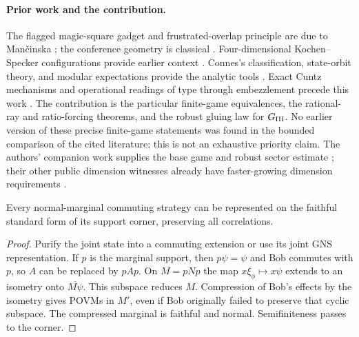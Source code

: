 \paragraph{Prior work and the contribution.}
The flagged magic-square gadget and frustrated-overlap principle are due to Man\v cinska \cite{FMS}; the conference geometry is classical \cite{Conference}. Four-dimensional Kochen--Specker configurations provide earlier context \cite{Cabello}. Connes's classification, state-orbit theory, and modular expectations provide the analytic tools \cite{Connes,CS,HS,Takesaki}. Exact Cuntz mechanisms and operational readings of type through embezzlement precede this work \cite{Harris,VLSWW}. The contribution is the particular finite-game equivalences, the rational-ray and ratio-forcing theorems, and the robust gluing law for $G_{\mathrm{III}}$. No earlier version of these precise finite-game statements was found in the bounded comparison of the cited literature; this is not an exhaustive priority claim. The authors' companion work supplies the base game and robust sector estimate \cite{Base}; their other public dimension witnesses already have faster-growing dimension requirements \cite{Explicit,Precision}.

\begin{lemma}\label{lem:support}
Every normal-marginal commuting strategy can be represented on the faithful standard form of its support corner, preserving all correlations.
\end{lemma}
\begin{proof}
Purify the joint state into a commuting extension or use its joint GNS representation. If $p$ is the marginal support, then $p\psi=\psi$ and Bob commutes with $p$, so $A$ can be replaced by $pAp$. On $M=pNp$ the map $x\xi_\phi\mapsto x\psi$ extends to an isometry onto $\overline{M\psi}$. This subspace reduces $M$. Compression of Bob's effects by the isometry gives POVMs in $M'$, even if Bob originally failed to preserve that cyclic subspace. The compressed marginal is faithful and normal. Semifiniteness passes to the corner.
\end{proof}
